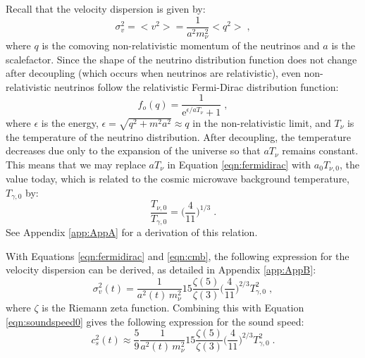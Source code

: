 \documentclass{aastex}
\newcommand{\me}{\mathrm{e}}
\begin{document}
Recall that the velocity dispersion is
given by:
\begin{equation}\label{eqm:veldisp}
  \sigma_v^2 = < v^2 > = \frac{1}{a^2 m_\nu^2} < q^2> \;,
\end{equation}
where $q$ is the comoving non-relativistic momentum of the neutrinos
and $a$ is the scalefactor. 
Since the shape of the neutrino distribution function does not change
after decoupling (which occurs when neutrinos are relativistic),  even
non-relativistic neutrinos follow the relativistic Fermi-Dirac distribution function:
\begin{equation}\label{eqn:fermidirac} 
  f_o(q) = \frac{1}{\me^{\epsilon/aT_\nu} + 1 }\;,
\end{equation}
where $\epsilon$ is the energy, $\epsilon = \sqrt{ q^2 + m^2 a^2}
\approx q $ in the non-relativistic limit, and
$T_\nu$ is the temperature of the neutrino distribution.  
After decoupling, the temperature decreases due only to the expansion of the
universe so that $aT_\nu$ remains constant. 
This means that we may replace $aT_\nu$ in Equation \eqref{eqn:fermidirac}
with $a_0T_{\nu,0}$, the value today, which is related to the cosmic
microwave background temperature, $T_{\gamma,0}$ by:
\begin{equation}\label{eqn:cmb}
  \frac{T_{\nu,0}}{T_{\gamma,0}} =\bigg(\frac{4}{11}\bigg)^{1/3}\;.
\end{equation}  
See Appendix \ref{app:AppA} for a derivation of this relation.

With Equations \eqref{eqn:fermidirac} and \eqref{eqn:cmb}, the following expression for the velocity dispersion can be
derived, as detailed in Appendix \ref{app:AppB}:
\begin{equation}\label{eqn:veldisp5}
  \sigma_v^2(t) = \frac{1}{a^2(t)\,m^2_\nu} 15 \frac{ \zeta(5) }{\zeta(3) } \bigg(
  \frac{4}{11} \bigg)^{2/3} T_{\gamma,0}^2 \;,
\end{equation}
where $\zeta$ is the Riemann zeta function. 
Combining this with Equation \eqref{eqn:soundspeed0} gives the
following expression for the sound speed:
\begin{equation}\label{eqn:soundspeed1}
  c_s^2(t) \approx \frac{5}{9} \frac{1}{a^2(t)\,m^2_\nu} 15 \frac{ \zeta(5) }{\zeta(3) } \bigg(
  \frac{4}{11} \bigg)^{2/3} T_{\gamma,0}^2 \;.
\end{equation}
\end{document}
